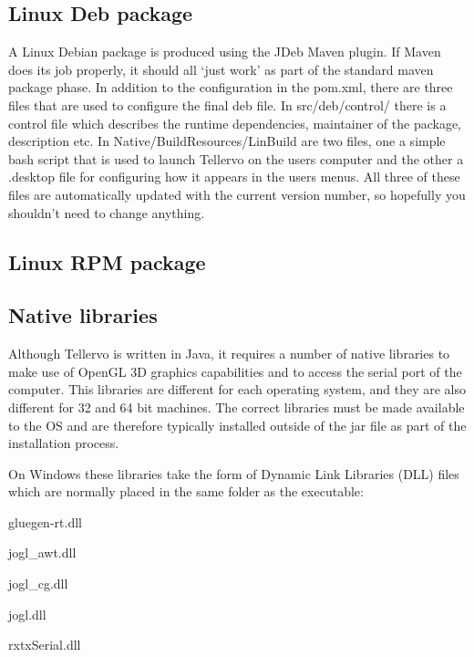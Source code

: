 \subsection{Linux Deb package}
A Linux Debian package is produced using the JDeb Maven plugin.  If Maven does its job properly, it should all `just work' as part of the standard maven package phase.  In addition to the configuration in the pom.xml, there are three files that are used to configure the final deb file.  In src/deb/control/ there is a control file which describes the runtime dependencies, maintainer of the package, description etc.  In Native/BuildResources/LinBuild are two files, one a simple bash script that is used to launch Tellervo on the users computer and the other a .desktop file for configuring how it appears in the users menus.  All three of these files are automatically updated with the current version number, so hopefully you shouldn't need to change anything. 


\subsection{Linux RPM package}

\subsection{Native libraries}
\label{txt:NativeLibraries}
Although Tellervo is written in Java, it requires a number of native libraries to make use of OpenGL 3D graphics capabilities and to access the serial port of the computer.  This libraries are different for each operating system, and they are also different for 32 and 64 bit machines.  The correct libraries must be made available to the OS and are therefore typically installed outside of the jar file as part of the installation process.  

On Windows these libraries take the form of Dynamic Link Libraries (DLL) files which are normally placed in the same folder as the executable:

\begin{itemize*}
 \item gluegen-rt.dll
 \item jogl\_awt.dll
 \item jogl\_cg.dll
 \item jogl.dll
 \item rxtxSerial.dll
\end{itemize*}

